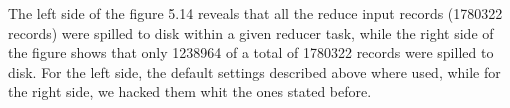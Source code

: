\begin{itemize}
The left side of the figure 5.14 reveals that all the reduce input records (1780322 records) were spilled to disk within a given reducer task, while the right side of the figure shows that only 1238964 of a total of 1780322 records were spilled to disk. For the left side, the default settings described above where used, while for the right side, we hacked them whit the ones stated before.


\end{itemize}























